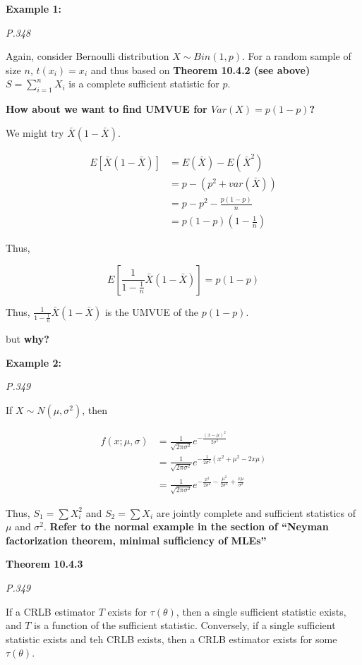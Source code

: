 \documentclass[]{book}
\begin{document}
\textbf{Example 1:}

\emph{P.348}

Again, consider Bernoulli distribution \(X \sim Bin(1,p)\). For a random sample of size \(n\), \(t(x_i)=x_i\) and thus based on \textbf{Theorem 10.4.2 (see above)} \(S=\sum_{i=1}^n X_i\) is a complete sufficient statistic for \(p\).

\textbf{How about we want to find UMVUE for \(Var(X)=p(1-p)\)?}

We might try \(\bar{X}(1-\bar{X})\).

\[\begin{aligned} E[\bar{X}(1-\bar{X})] &=E(\bar{X})-E(\bar{X}^2) \\ &=p-(p^2+var(\bar{X})) \\ &=p-p^2-\frac{p(1-p)}{n} \\ &=p(1-p)(1-\frac{1}{n}) \end{aligned}\]

Thus,

\[E[\frac{1}{1-\frac{1}{n}}\bar{X}(1-\bar{X})]=p(1-p)\]

Thus, \(\frac{1}{1-\frac{1}{n}}\bar{X}(1-\bar{X})\) is the UMVUE of the \(p(1-p)\).

but \textbf{why?}

\textbf{Example 2:}

\emph{P.349}

If \(X \sim N(\mu,\sigma^2)\), then

\[\begin{aligned} f(x;\mu,\sigma)&=\frac{1}{\sqrt{2\pi \sigma^2}}e^{-\frac{(x-\mu)^2}{2\sigma^2}} \\ &=\frac{1}{\sqrt{2\pi \sigma^2}}e^{-\frac{1}{2\sigma^2}(x^2+\mu^2-2x\mu)} \\ &=\frac{1}{\sqrt{2\pi \sigma^2}}e^{-\frac{x^2}{2\sigma^2}-\frac{\mu^2}{2\sigma^2}+\frac{x\mu}{\sigma^2}} \end{aligned}\]

Thus, \(S_1=\sum X_i^2\) and \(S_2=\sum X_i\) are jointly complete and sufficient statistics of \(\mu\) and \(\sigma^2\). \textbf{Refer to the normal example in the section of ``Neyman factorization theorem, minimal sufficiency of MLEs''}

\textbf{Theorem 10.4.3}

\emph{P.349}

If a CRLB estimator \(T\) exists for \(\tau(\theta)\), then a single sufficient statistic exists, and \(T\) is a function of the sufficient statistic. Conversely, if a single sufficient statistic exists and teh CRLB exists, then a CRLB estimator exists for some \(\tau(\theta)\).
\end{document}
